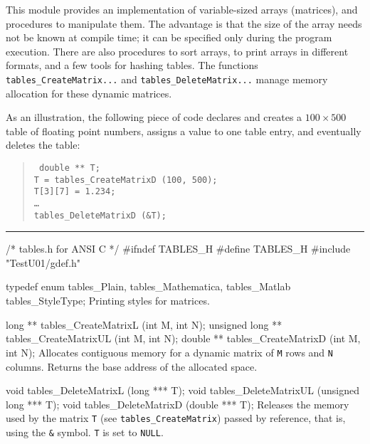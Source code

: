
This module provides an implementation of variable-sized arrays (matrices),
and procedures to manipulate them.
The advantage is that the size of the array needs not be known
at compile time; it can be specified only during the program execution.
There are also procedures to sort arrays,  to
print  arrays in different formats,
and a few tools for hashing tables.
The functions {\tt tables\_CreateMatrix...} and
{\tt tables\_DeleteMatrix...} manage memory allocation for
these dynamic matrices.

As an illustration, the following piece of code declares and creates
a $100\times 500$ table of floating point numbers, assigns a value
to one table entry, and eventually deletes the table:
  \begin{verse}{\tt
    double ** T;\\
    T = tables\_CreateMatrixD (100, 500);\\
    T[3][7] = 1.234;\\
    \dots \\
    tables\_DeleteMatrixD (\&T);
  }\end{verse}

\bigskip\hrule
\code\hide
/* tables.h for ANSI C */
#ifndef TABLES_H
#define TABLES_H
\endhide
#include "TestU01/gdef.h"
\endcode

\code

typedef enum {
   tables_Plain,
   tables_Mathematica,
   tables_Matlab
   } tables_StyleType;
\endcode
  \tab Printing styles for matrices.
  \endtab

\code

long ** tables_CreateMatrixL  (int M, int N);
unsigned long ** tables_CreateMatrixUL (int M, int N);
double ** tables_CreateMatrixD  (int M, int N);
\endcode
  \tab Allocates contiguous memory for a dynamic
  matrix of {\tt M} rows and {\tt N} columns. Returns the base
  address of the allocated space.
  \endtab
\code


void tables_DeleteMatrixL  (long *** T);
void tables_DeleteMatrixUL (unsigned long *** T);
void tables_DeleteMatrixD  (double *** T);
\endcode
  \tab Releases the memory used by the matrix {\tt T}
  (see {\tt tables\_CreateMatrix}) passed by
  reference, that is, using the {\tt \&} symbol.
  {\tt T} is set to {\tt NULL}.
  \endtab
\code


